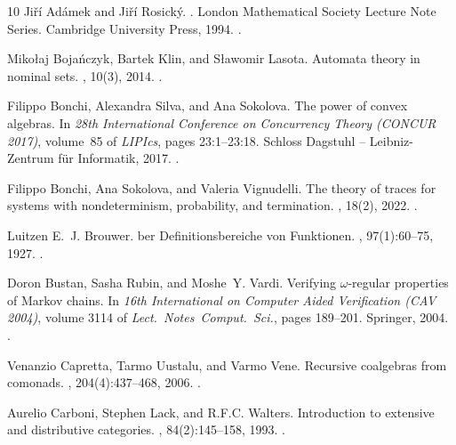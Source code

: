\documentclass[10pt,a4paper]{article}
\theoremstyle{definition}
\theoremstyle{remark}
\numberwithin{equation}{section}
\theoremstyle{plain}
\theoremstyle{definition}
\begin{document}
\begin{thebibliography}{10}
Ji\v{r}\'i Ad\'amek and Ji\v{r}\'i Rosick\'y.
.
\newblock London Mathematical Society Lecture Note Series. Cambridge University
  Press, 1994.
\newblock \href {https://doi.org/10.1017/CBO9780511600579}
  {}.

Miko{\l}aj Boja{\'n}czyk, Bartek Klin, and S{\l}awomir Lasota.
\newblock Automata theory in nominal sets.
, 10(3), 2014.
\newblock \href {https://doi.org/10.2168/LMCS-10(3:4)2014}
  {}.

Filippo Bonchi, Alexandra Silva, and Ana Sokolova.
\newblock The power of convex algebras.
\newblock In {\em 28th International Conference on Concurrency Theory (CONCUR
  2017)}, volume~85 of {\em LIPIcs}, pages 23:1--23:18. Schloss Dagstuhl --
  Leibniz-Zentrum f{\"u}r Informatik, 2017.
\newblock \href {https://doi.org/10.4230/LIPIcs.CONCUR.2017.23}
  {}.

Filippo Bonchi, Ana Sokolova, and Valeria Vignudelli.
\newblock The theory of traces for systems with nondeterminism, probability,
  and termination.
, 18(2), 2022.
\newblock \href {https://doi.org/10.46298/lmcs-18(2:21)2022}
  {}.

Luitzen E.~J. Brouwer.
ber {D}efinitionsbereiche von {F}unktionen.
, 97(1):60--75, 1927.
\newblock \href {https://doi.org/10.1007/BF01447860}
  {}.

Doron Bustan, Sasha Rubin, and Moshe~Y. Vardi.
\newblock Verifying $\omega$-regular properties of {M}arkov chains.
\newblock In {\em 16th International on Computer Aided Verification (CAV
  2004)}, volume 3114 of {\em Lect.~Notes~Comput.~Sci.}, pages 189--201.
  Springer, 2004.
\newblock \href {https://doi.org/10.1007/978-3-540-27813-9_15}
  {}.

Venanzio Capretta, Tarmo Uustalu, and Varmo Vene.
\newblock Recursive coalgebras from comonads.
, 204(4):437--468, 2006.
\newblock \href {https://doi.org/10.1016/J.IC.2005.08.005}
  {}.

Aurelio Carboni, Stephen Lack, and R.F.C. Walters.
\newblock Introduction to extensive and distributive categories.
, 84(2):145--158, 1993.
\newblock \href {https://doi.org/10.1016/0022-4049(93)90035-R}
  {}.


\end{thebibliography}
\end{document}
